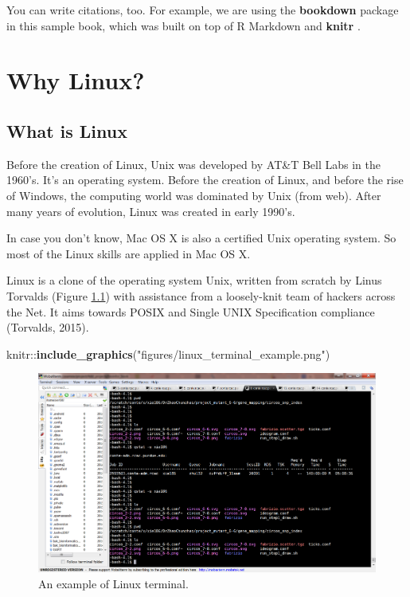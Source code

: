 \documentclass[]{book}
\newenvironment{Shaded}{\begin{snugshade}}{\end{snugshade}}
\newcommand{\KeywordTok}[1]{\textcolor[rgb]{0.13,0.29,0.53}{\textbf{{#1}}}}
\newcommand{\StringTok}[1]{\textcolor[rgb]{0.31,0.60,0.02}{{#1}}}
\newcommand{\NormalTok}[1]{{#1}}
\begin{document}
You can write citations, too. For example, we are using the
\textbf{bookdown} package \citep{R-bookdown} in this sample book, which
was built on top of R Markdown and \textbf{knitr} \citep{xie2015}.

\chapter{Why Linux?}\label{why-linux}

\section{What is Linux}\label{what-is-linux}

Before the creation of Linux, Unix was developed by AT\&T Bell Labs in
the 1960's. It's an operating system. Before the creation of Linux, and
before the rise of Windows, the computing world was dominated by Unix
(from web). After many years of evolution, Linux was created in early
1990's.

In case you don't know, Mac OS X is also a certified Unix operating
system. So most of the Linux skills are applied in Mac OS X.

Linux is a clone of the operating system Unix, written from scratch by
Linus Torvalds (Figure \ref{fig:LinuxTerminal}) with assistance from a
loosely-knit team of hackers across the Net. It aims towards POSIX and
Single UNIX Specification compliance (Torvalds, 2015).



\begin{Shaded}
\begin{Highlighting}[]
\NormalTok{knitr::}\KeywordTok{include_graphics}\NormalTok{(}\StringTok{"figures/linux_terminal_example.png"}\NormalTok{)}
\end{Highlighting}
\end{Shaded}

\begin{figure}
\includegraphics[width=1\linewidth]{figures/linux_terminal_example} \caption{An example of Linux terminal.}\label{fig:LinuxTerminal}
\end{figure}
\end{document}
